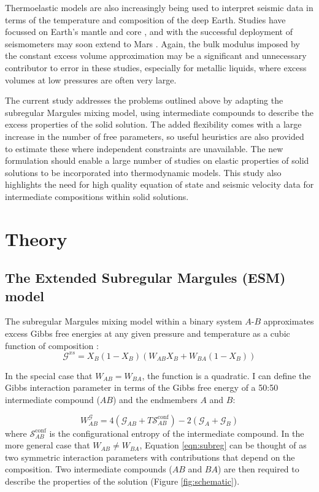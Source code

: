 \documentclass[review]{elsarticle}
\begin{document}
Thermoelastic models are also increasingly being used to interpret seismic data in terms of the temperature and composition of the deep Earth. Studies have focussed on Earth's mantle \citep[e.g.][]{DGDSBR2012, MCDRT2012, DCT2012} and core \citep[e.g.][]{SGGFMM2000,SFGMM2004}, and with the successful deployment of seismometers may soon extend to Mars \citep{GLZR2014}. Again, the bulk modulus imposed by the constant excess volume approximation may be a significant and unnecessary contributor to error in these studies, especially for metallic liquids, where excess volumes at low pressures are often very large. 

The current study addresses the problems outlined above by adapting the subregular Margules mixing model, using intermediate compounds to describe the excess properties of the solid solution. The added flexibility comes with a large increase in the number of free parameters, so useful heuristics are also provided to estimate these where independent constraints are unavailable. The new formulation should enable a large number of studies on elastic properties of solid solutions to be incorporated into thermodynamic models. This study also highlights the need for high quality equation of state and seismic velocity data for intermediate compositions within solid solutions.

\section{Theory} 
\subsection{The Extended Subregular Margules (ESM) model}
The subregular Margules mixing model within a binary system $A$-$B$ approximates excess Gibbs free energies at any given pressure and temperature as a cubic function of composition \citep{HW1989}:
\begin{equation}
  \mathcal{G}^{xs} = X_B (1-X_B) \left(W_{AB} X_B + W_{BA} (1-X_B) \right)
  \label{eqn:subreg}
\end{equation}

In the special case that $W_{AB} = W_{BA}$, the function is a quadratic. I can define the Gibbs interaction parameter in terms of the Gibbs free energy of a 50:50 intermediate compound ($AB$) and the endmembers $A$ and $B$:

\begin{equation}
  W^{\mathcal{G}}_{AB} = 4(\mathcal{G}_{AB} + T\mathcal{S}^{\textrm{conf}}_{AB}) - 2(\mathcal{G}_A + \mathcal{G}_B)
\end{equation}
\noindent where $\mathcal{S}^{\textrm{conf}}_{AB}$ is the configurational entropy of the intermediate compound. In the more general case that $W_{AB} \neq W_{BA}$, Equation \ref{eqn:subreg} can be thought of as two symmetric interaction parameters with contributions that depend on the composition. Two intermediate compounds ($AB$ and $BA$) are then required to describe the properties of the solution (Figure \ref{fig:schematic}).
\end{document}
